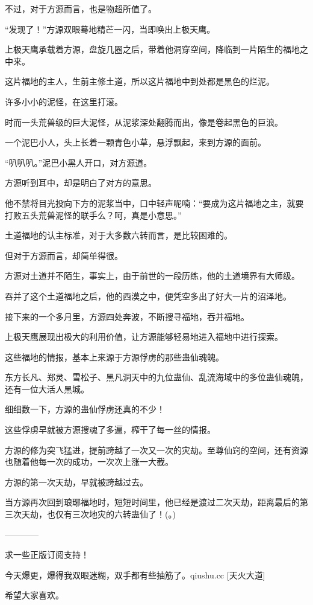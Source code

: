 \begin{this_body}
不过，对于方源而言，也是物超所值了。

“发现了！”方源双眼蓦地精芒一闪，当即唤出上极天鹰。

上极天鹰承载着方源，盘旋几圈之后，带着他洞穿空间，降临到一片陌生的福地之中来。

这片福地的主人，生前主修土道，所以这片福地中到处都是黑色的烂泥。

许多小小的泥怪，在这里打滚。

时而一头荒兽级的巨大泥怪，从泥浆深处翻腾而出，像是卷起黑色的巨浪。

一个泥巴小人，头上长着一颗青色小草，悬浮飘起，来到方源的面前。

“叭叭叭。”泥巴小黑人开口，对方源道。

方源听到耳中，却是明白了对方的意思。

他不禁将目光投向下方的泥浆当中，口中轻声呢喃：“要成为这片福地之主，就要打败五头荒兽泥怪的联手么？呵，真是小意思。”

土道福地的认主标准，对于大多数六转而言，是比较困难的。

但对于方源而言，却简单得很。

方源对土道并不陌生，事实上，由于前世的一段历练，他的土道境界有大师级。

吞并了这个土道福地之后，他的西漠之中，便凭空多出了好大一片的沼泽地。

接下来的一个多月里，方源四处奔波，不断搜寻福地，吞并福地。

上极天鹰展现出极大的利用价值，让方源能够轻易地进入福地中进行探索。

这些福地的情报，基本上来源于方源俘虏的那些蛊仙魂魄。

东方长凡、郑灵、雪松子、黑凡洞天中的九位蛊仙、乱流海域中的多位蛊仙魂魄，还有一位大活人黑城。

细细数一下，方源的蛊仙俘虏还真的不少！

这些俘虏早就被方源搜魂了多遍，榨干了每一丝的情报。

方源的修为突飞猛进，提前跨越了一次又一次的灾劫。至尊仙窍的空间，还有资源也随着他每一次的成功，一次次上涨一大截。

方源的第一次天劫，早就被跨越过去。

当方源再次回到琅琊福地时，短短时间里，他已经是渡过二次天劫，距离最后的第三次天劫，也仅有三次地灾的六转蛊仙了！(。)

------------

求一些正版订阅支持！

今天爆更，爆得我双眼迷糊，双手都有些抽筋了。qiushu.cc [天火大道]

希望大家喜欢。


\end{this_body}
